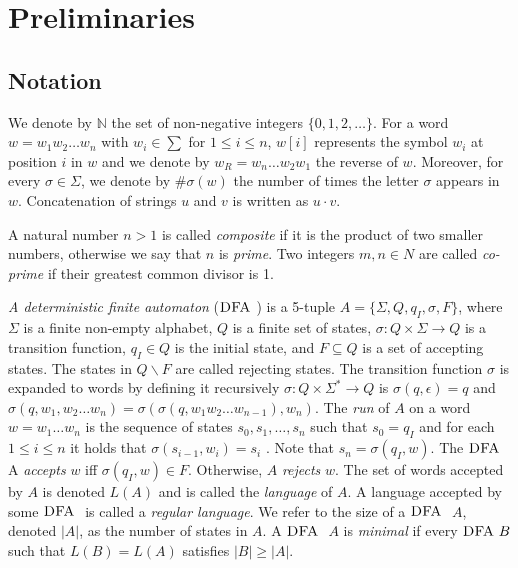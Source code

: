 \chapter{Preliminaries}
\label{ch:Preliminaries}

\section{Notation}
We denote by $\mathbb{N}$ the set of non-negative integers $\{0, 1, 2, \dots \}$. For a word $w = w_1 w_2 \dots w_n$ with $w_i \in \sum$ for $1 \leq i \leq n$, $w[i]$ represents the symbol $w_i$ at position $i$ in $w$ and we denote by $w_R = w_n \dots w_2 w_1$ the reverse of $w$. Moreover, for every $\sigma \in \Sigma$, we denote by $\#\sigma(w)$ the number of times the letter $\sigma$ appears in $w$. Concatenation of strings $u$ and $v$ is written as $u \cdot v$. 

A natural number $n > 1$ is called \textit{composite} if it is the product of two smaller numbers, otherwise we say that $n$ is \textit{prime}. Two integers $m, n \in N$ are called \textit{co-prime} if their greatest common divisor is 1.


\textit{A deterministic finite automaton} ($\textsc{DFA}~$) is a 5-tuple $A = \lbrace\Sigma, Q, q_I , \sigma, F\rbrace$, where $\Sigma$ is a finite non-empty alphabet, $Q$ is a finite set of states, $\sigma : Q \times \Sigma \rightarrow Q$ is a transition function, $q_I \in Q$ is the initial state, and $F \subseteq Q$ is a set of accepting states. The states in $Q \backslash F$ are called rejecting states. The transition function $\sigma$ is expanded to words by defining it recursively $\sigma : Q \times \Sigma^* \rightarrow Q$ is $\sigma(q, \epsilon) = q$ and $\sigma(q, w_1, w_2 \dots w_n ) = \sigma(\sigma(q, w_1 w_2 \dots w_{n-1} ), w_n )$. The \textit{run} of $A$ on a word $w = w_1 \dots w_n$ is the sequence of states $s_0 , s_1 , \dots , s_n$ such that $s_0 = q_I$ and for each $1 \leq i \leq n$ it holds that $\sigma(s_{i-1} , w_i ) = s_i$ . Note that $s_n = \sigma(q_I , w)$. The $\textsc{DFA}~$ A \textit{accepts} $w$ iff $\sigma(q_I , w) \in F$. Otherwise, $A$ \textit{rejects} $w$. The set of words accepted by $A$ is denoted $L(A)$ and is called the \textit{language} of $A$. A language accepted by some $\textsc{DFA}~$ is called a \textit{regular language}. We refer to the size of a $\textsc{DFA}~$ $A$, denoted $|A|$, as the number of states in $A$. A $\textsc{DFA}~$ $A$ is \textit{minimal} if every $\textsc{DFA}~ B$ such that $L(B) = L(A)$ satisfies $|B| \geq |A|$.

